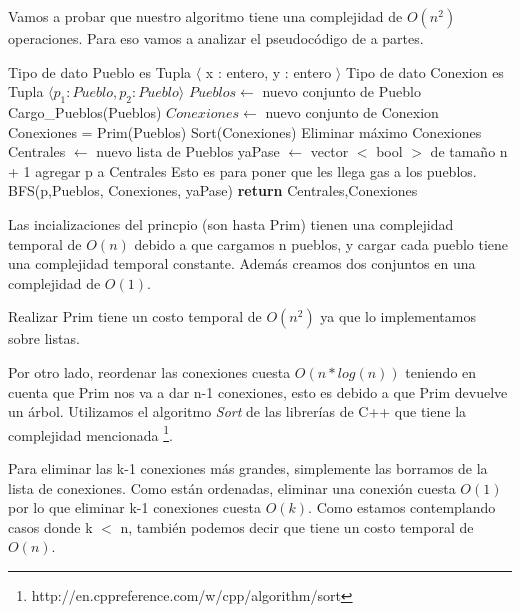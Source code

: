Vamos a probar que nuestro algoritmo tiene una complejidad de $O(n^2)$ operaciones. Para eso vamos a analizar el pseudocódigo de a partes.

\begin{center}
\begin{pseudo}
\State Tipo de dato Pueblo es Tupla $\langle$ x : entero, y : entero $\rangle$
\State Tipo de dato Conexion es Tupla $\langle p_1 : Pueblo, p_2 : Pueblo \rangle$
        \State $Pueblos \leftarrow$ nuevo conjunto de Pueblo 
        \State Cargo\_Pueblos(Pueblos) 
        \State $Conexiones \leftarrow$ nuevo conjunto de Conexion 
        \State Conexiones = Prim(Pueblos) 
        \State Sort(Conexiones) 
         
	  \State Eliminar máximo Conexiones 
	\EndFor
        \State Centrales $\leftarrow$ nuevo lista de Pueblos 
        \State yaPase $\leftarrow$ vector $<$ bool $>$ de tamaño n + 1 
         
         
        \State agregar p a Centrales 
        \Comment Esto es para poner que les llega gas a los pueblos.
        \State BFS(p,Pueblos, Conexiones, yaPase) 
        \EndIf
        \EndFor
        \State \textbf{return} Centrales,Conexiones 
    \EndProcedure
\end{pseudo}
\end{center}

Las incializaciones del princpio (son hasta Prim) tienen una complejidad temporal de $O(n)$ debido a que cargamos n pueblos, y cargar cada pueblo tiene una complejidad temporal constante. Además creamos dos conjuntos en una complejidad de $O(1)$.

Realizar Prim tiene un costo temporal de $O(n^2)$ ya que lo implementamos sobre listas.

Por otro lado, reordenar las conexiones cuesta $O(n*log(n))$ teniendo en cuenta que Prim nos va a dar n-1 conexiones, esto es debido a que Prim devuelve un árbol. Utilizamos el algoritmo \emph{Sort} de las librerías de C++ que tiene la complejidad mencionada \footnote{http://en.cppreference.com/w/cpp/algorithm/sort}.

Para eliminar las k-1 conexiones más grandes, simplemente las borramos de la lista de conexiones. Como están ordenadas, eliminar una conexión cuesta $O(1)$ por lo que eliminar k-1 conexiones cuesta $O(k)$. Como estamos contemplando casos donde k  $<$ n, también podemos decir que tiene un costo temporal de $O(n)$.


